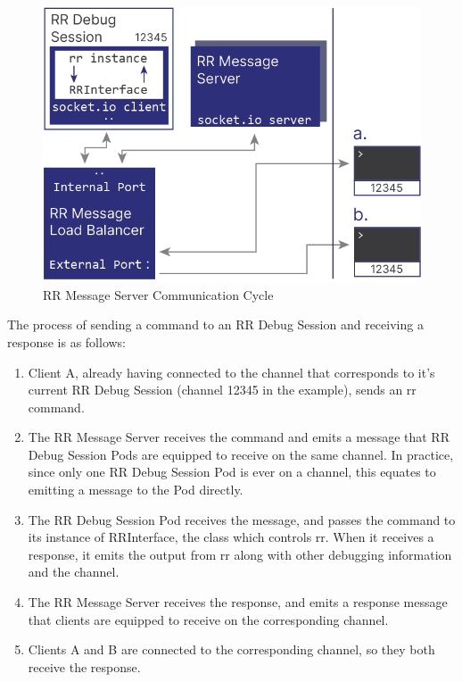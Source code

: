 \documentclass[12pt]{article}
\begin{document}
\begin{figure}[h!]

  \includegraphics[scale=.8]{rr_detailed}
  \centering
  \caption{RR Message Server Communication Cycle}
  \label{rr:detailed}
\end{figure}

The process of sending a command to an RR Debug Session and receiving
a response is as follows:

\begin{enumerate}
\item Client A, already having connected to the channel that
  corresponds to it's current RR Debug Session (channel 12345 in the
  example), sends an rr command.
\item The RR Message Server receives the command and emits a message
  that RR Debug Session Pods are equipped to receive on the same
  channel.  In practice, since only one RR Debug Session Pod is ever
  on a channel, this equates to emitting a message to the Pod
  directly.
\item The RR Debug Session Pod receives the message, and passes the
  command to its instance of RRInterface, the class which controls rr.
  When it receives a response, it emits the output from rr along with
  other debugging information and the channel.
\item The RR Message Server receives the response, and emits a
  response message that clients are equipped to receive on the
  corresponding channel.
\item Clients A and B are connected to the corresponding channel, so
  they both receive the response.
\end{enumerate}
\end{document}

